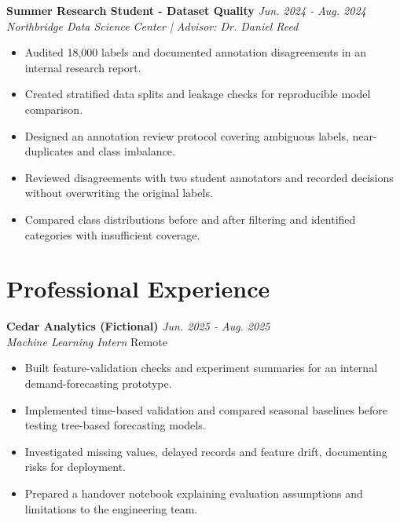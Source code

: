 \documentclass[11pt,a4paper]{article}
\begin{document}
\textbf{Summer Research Student - Dataset Quality} \hfill \textit{Jun. 2024 - Aug. 2024}\\
\textit{Northbridge Data Science Center | Advisor: Dr. Daniel Reed}
\begin{itemize}[leftmargin=*,noitemsep,topsep=2pt]
\item Audited 18,000 labels and documented annotation disagreements in an internal research report.
\item Created stratified data splits and leakage checks for reproducible model comparison.
\item Designed an annotation review protocol covering ambiguous labels, near-duplicates and class imbalance.
\item Reviewed disagreements with two student annotators and recorded decisions without overwriting the original labels.
\item Compared class distributions before and after filtering and identified categories with insufficient coverage.
\end{itemize}

\section{Professional Experience}
\textbf{Cedar Analytics (Fictional)} \hfill \textit{Jun. 2025 - Aug. 2025}\\
\textit{Machine Learning Intern} \hfill Remote
\begin{itemize}[leftmargin=*,noitemsep,topsep=2pt]
\item Built feature-validation checks and experiment summaries for an internal demand-forecasting prototype.
\item Implemented time-based validation and compared seasonal baselines before testing tree-based forecasting models.
\item Investigated missing values, delayed records and feature drift, documenting risks for deployment.
\item Prepared a handover notebook explaining evaluation assumptions and limitations to the engineering team.
\end{itemize}
\vspace{4pt}
\end{document}
